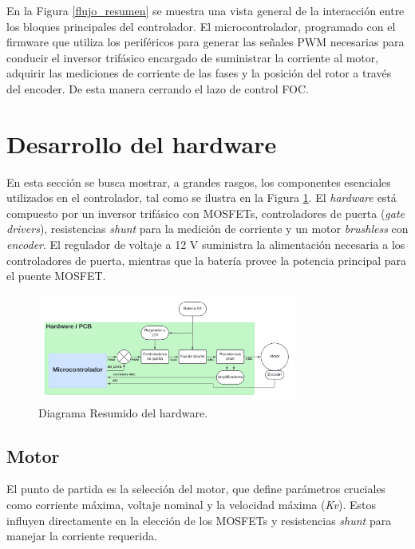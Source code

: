 \documentclass[11pt]{report}
\begin{document}
En la Figura \ref{flujo_resumen} se muestra una vista general de la interacción entre los bloques principales del controlador. El microcontrolador, programado con el firmware que utiliza los periféricos para generar las señales PWM necesarias para conducir el inversor trifásico encargado de suministrar la corriente al motor, adquirir las mediciones de corriente de las fases y la posición del rotor a través del encoder. De esta manera cerrando el lazo de control FOC.

\newpage
\section{Desarrollo del hardware}
En esta sección se busca mostrar, a grandes rasgos, los componentes esenciales utilizados en el controlador, tal como se ilustra en la Figura \ref{flujo_resumen_hardware}. El \emph{hardware} está compuesto por un inversor trifásico con MOSFETs, controladores de puerta (\emph{gate drivers}), resistencias \emph{shunt} para la medición de corriente y un motor \emph{brushless} con \emph{encoder}. El regulador de voltaje a 12 V suministra la alimentación necesaria a los controladores de puerta, mientras que la batería provee la potencia principal para el puente MOSFET.

\begin{figure}[ht]
	\centering
	\includegraphics[width=0.76\textwidth]{imagenes/Diagramas/Diagramas - resumen hardware.png}
	\caption{Diagrama Resumido del hardware.}
	\label{flujo_resumen_hardware}
\end{figure}
\FloatBarrier

\subsection{Motor}

El punto de partida es la selección del motor, que define parámetros cruciales como corriente máxima, voltaje nominal y la velocidad máxima (\emph{Kv}). Estos influyen directamente en la elección de los MOSFETs y resistencias \emph{shunt} para manejar la corriente requerida.
\end{document}
